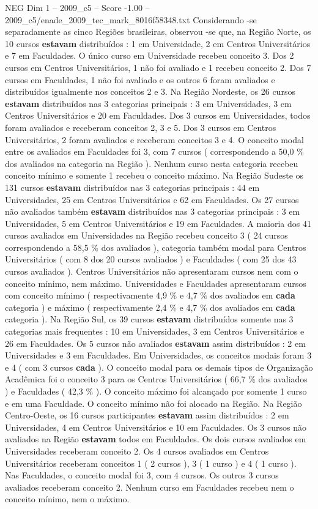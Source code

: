 \begin{textsample}{NEG Dim 1 – 2009\_c5 – Score -1.00 – 2009\_c5/enade\_2009\_tec\_mark\_8016f58348.txt}
Considerando -se separadamente as cinco Regiões brasileiras, observou -se que, na Região Norte, os 10 cursos \textbf{estavam} distribuídos : 1 em Universidade, 2 em Centros Universitários e 7 em Faculdades.
O único curso em Universidade recebeu conceito 3.
Dos 2 cursos em Centros Universitários, 1 não foi avaliado e 1 recebeu conceito 2.
Dos 7 cursos em Faculdades, 1 não foi avaliado e os outros 6 foram avaliados e distribuídos igualmente nos conceitos 2 e 3.
Na Região Nordeste, os 26 cursos \textbf{estavam} distribuídos nas 3 categorias principais : 3 em Universidades, 3 em Centros Universitários e 20 em Faculdades.
Dos 3 cursos em Universidades, todos foram avaliados e receberam conceitos 2, 3 e 5.
Dos 3 cursos em Centros Universitários, 2 foram avaliados e receberam conceitos 3 e 4.
O conceito modal entre os avaliados em Faculdades foi 3, com 7 cursos ( correspondendo a 50,0 \% dos avaliados na categoria na Região ).
Nenhum curso nesta categoria recebeu conceito mínimo e somente 1 recebeu o conceito máximo.
Na Região Sudeste os 131 cursos \textbf{estavam} distribuídos nas 3 categorias principais : 44 em Universidades, 25 em Centros Universitários e 62 em Faculdades.
Os 27 cursos não avaliados também \textbf{estavam} distribuídos nas 3 categorias principais : 3 em Universidades, 5 em Centros Universitários e 19 em Faculdades.
A maioria dos 41 cursos avaliados em Universidades na Região recebeu conceito 3 ( 24 cursos correspondendo a 58,5 \% dos avaliados ), categoria também modal para Centros Universitários ( com 8 dos 20 cursos avaliados ) e Faculdades ( com 25 dos 43 cursos avaliados ).
Centros Universitários não apresentaram cursos nem com o conceito mínimo, nem máximo.
Universidades e Faculdades apresentaram cursos com conceito mínimo ( respectivamente 4,9 \% e 4,7 \% dos avaliados em \textbf{cada} categoria ) e máximo ( respectivamente 2,4 \% e 4,7 \% dos avaliados em \textbf{cada} categoria ).
Na Região Sul, os 39 cursos \textbf{estavam} distribuídos somente nas 3 categorias mais frequentes : 10 em Universidades, 3 em Centros Universitários e 26 em Faculdades.
Os 5 cursos não avaliados \textbf{estavam} assim distribuídos : 2 em Universidades e 3 em Faculdades.
Em Universidades, os conceitos modais foram 3 e 4 ( com 3 cursos \textbf{cada} ).
O conceito modal para os demais tipos de Organização Acadêmica foi o conceito 3 para os Centros Universitários ( 66,7 \% dos avaliados ) e Faculdades ( 42,3 \% ).
O conceito máximo foi alcançado por somente 1 curso e em uma Faculdade.
O conceito mínimo não foi alocado na Região.
Na Região Centro-Oeste, os 16 cursos participantes \textbf{estavam} assim distribuídos : 2 em Universidades, 4 em Centros Universitários e 10 em Faculdades.
Os 3 cursos não avaliados na Região \textbf{estavam} todos em Faculdades.
Os dois cursos avaliados em Universidades receberam conceito 2.
Os 4 cursos avaliados em Centros Universitários receberam conceitos 1 ( 2 cursos ), 3 ( 1 curso ) e 4 ( 1 curso ).
Nas Faculdades, o conceito modal foi 3, com 4 cursos.
Os outros 3 cursos avaliados receberam conceito 2.
Nenhum curso em Faculdades recebeu nem o conceito mínimo, nem o máximo.

\end{textsample}
